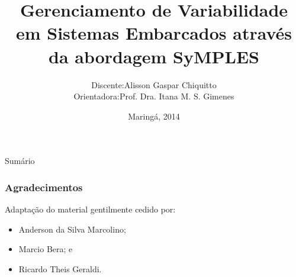 \documentclass[aspectratio=32]{beamer}
\title[Experimento - Abordagem SyMPLES]{Gerenciamento de Variabilidade em Sistemas Embarcados através da abordagem SyMPLES}
\date{Maringá, 2014}
\begin{document}
\author[Alisson G. Chiquitto]{\begin{tabular}{r@{ }l} 
Discente:       & Alisson Gaspar Chiquitto \\[1ex] 
Orientadora:    & Prof. Dra. Itana M. S. Gimenes
\end{tabular}}

\begin{frame}
  \titlepage
\end{frame}

\begin{frame}{Sumário}
  \tableofcontents
\end{frame}


\begin{frame}
\frametitle{Agradecimentos}

  Adaptação do material gentilmente cedido por:
  
  \begin{itemize}
    \item {
      Anderson da Silva Marcolino;
    }
    \item {
      Marcio Bera; e
    }
    \item {
      Ricardo Theis Geraldi.
    }
  \end{itemize}

\end{frame}





% 
\end{document}

